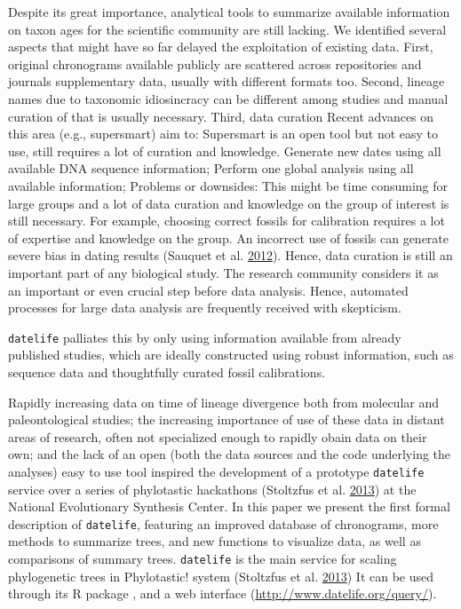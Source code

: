 \documentclass[]{article}
\begin{document}
Despite its great importance, analytical tools to summarize available information
on taxon ages for the scientific community are still lacking.
We identified several aspects that might have so far delayed the exploitation of
existing data. First, original chronograms available publicly are scattered across repositories
and journals supplementary data, usually with different formats too.
Second, lineage names due to taxonomic idiosincracy can be different among studies
and manual curation of that is usually necessary.
Third, data curation
Recent advances on this area (e.g., supersmart) aim to:
Supersmart is an open tool but not easy to use, still requires a lot of curation and knowledge.
Generate new dates using all available DNA sequence information;
Perform one global analysis using all available information;
Problems or downsides: This might be time consuming for large groups and a lot of
data curation and knowledge on the group of interest is still necessary. For example,
choosing correct fossils for calibration
requires a lot of expertise and knowledge on the group. An incorrect use of fossils
can generate severe bias in dating results (Sauquet et al. \protect\hyperlink{ref-Sauquet2012c}{2012}).
Hence, data curation is still an important part of any biological study. The research
community considers it as an important or even crucial step before data analysis.
Hence, automated processes for large data analysis are frequently received with skepticism.

\texttt{datelife} palliates this by only using information available from already published
studies, which are ideally constructed using robust information, such as sequence
data and thoughtfully curated fossil calibrations.

Rapidly increasing data on time of lineage divergence both from molecular and paleontological studies; the increasing importance of use of these data in distant areas of research, often not specialized enough to rapidly obain data on their own; and the lack of an open (both the data sources and the code underlying the analyses) easy to use tool
inspired the development of a prototype \texttt{datelife} service over a series
of phylotastic hackathons (Stoltzfus et al. \protect\hyperlink{ref-Stoltzfus2013}{2013}) at the National Evolutionary Synthesis Center.
In this paper we present the first formal description of \texttt{datelife}, featuring an improved database of chronograms, more methods to summarize trees, and new functions to visualize data, as well as comparisons of summary trees.
\texttt{datelife} is the main service for scaling phylogenetic trees in Phylotastic! system
(Stoltzfus et al. \protect\hyperlink{ref-Stoltzfus2013}{2013})
It can be used through its R package , and a web interface
(\url{http://www.datelife.org/query/}).
\end{document}
